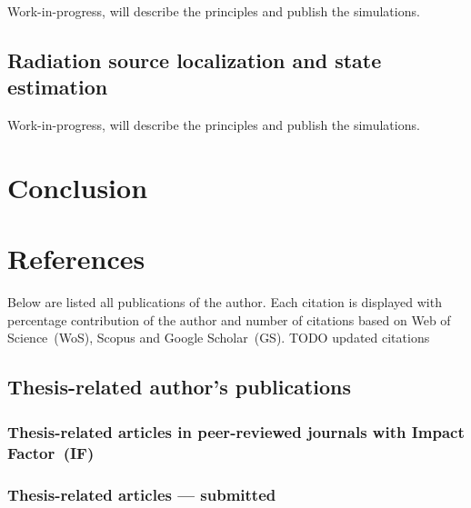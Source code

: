 \documentclass[a4paper,11pt,titlepage,twoside]{book}
\newcommand{\todo}[1]{{\color{red} TODO {#1}}}
\newcommand{\chapternoclear}[1]{
  \begingroup
  \let\cleardoublepage\clearpage
  \chapter{#1}
  \endgroup
}
\begin{document}
Work-in-progress, will describe the principles and publish the simulations.

\section{Radiation source localization and state estimation}

Work-in-progress, will describe the principles and publish the simulations.




\chapternoclear{Conclusion}



\appendix
\renewcommand\chaptername{Appendix}

\chapternoclear{References}

Below are listed all publications of the author.
Each citation is displayed with percentage contribution of the author and number of citations based on Web of Science~(WoS), Scopus and Google Scholar~(GS).
\todo{updated citations}

\section{Thesis-related author's publications}

\subsection*{Thesis-related articles in peer-reviewed journals with Impact Factor~(IF)}
\printbibliography[keyword={mine},keyword={phd_related},keyword={journal},keyword={if},heading=none,title={}]

\subsection*{Thesis-related articles --- submitted}
\printbibliography[keyword={mine},keyword={phd_related},keyword={journal},keyword={submitted},heading=none,title={}]
\end{document}

